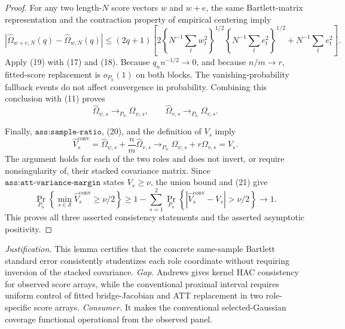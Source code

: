 \documentclass{article}
\begin{document}
\begin{proof}
For any two length-\(N\) score vectors \(w\) and \(w+e\), the same Bartlett-matrix representation and the contraction property of empirical centering imply
\[
 |\widehat\Omega_{w+e,N}(q)-\widehat\Omega_{w,N}(q)|
 \leq(2q+1)\left[
  2\left\{N^{-1}\sum_tw_t^2\right\}^{1/2}
    \left\{N^{-1}\sum_te_t^2\right\}^{1/2}
  +N^{-1}\sum_te_t^2
 \right].                                                                           \tag{19}
\]
Apply (19) with (17) and (18).  Because \(q_n n^{-1/2}\to0\), and because \(n/m\to r\), fitted-score replacement is \(o_{P_n}(1)\) on both blocks.  The vanishing-probability fallback events do not affect convergence in probability.  Combining this conclusion with (11) proves
\[
 \widehat\Omega_{\psi,s}\to_{P_n}\Omega_{\psi,s},
 \qquad
 \widehat\Omega_{v,s}\to_{P_n}\Omega_{v,s}.                                       \tag{20}
\]

Finally, \(\texttt{ass:sample-ratio}\), (20), and the definition of \(V_s\) imply
\[
 \widehat V_s^{\mathrm{conv}}
 =\widehat\Omega_{\psi,s}+\frac nm\widehat\Omega_{v,s}
 \to_{P_n}\Omega_{\psi,s}+r\Omega_{v,s}=V_s.                                     \tag{21}
\]
The argument holds for each of the two roles and does not invert, or require nonsingularity of, their stacked covariance matrix.  Since \(\texttt{ass:att-variance-margin}\) states \(V_s\geq\nu\), the union bound and (21) give
\[
 \Pr_{P_n}\left\{\min_{s\in\mathcal S}\widehat V_s^{\mathrm{conv}}\geq\nu/2\right\}
 \geq 1-\sum_{s=1}^2
 \Pr_{P_n}\left\{|\widehat V_s^{\mathrm{conv}}-V_s|>\nu/2\right\}
 \longrightarrow1.
\]
This proves all three asserted consistency statements and the asserted asymptotic positivity.
\end{proof}
\par\smallskip\noindent \textit{Justification.} This lemma certifies that the concrete same-sample Bartlett standard error consistently studentizes each role coordinate without requiring inversion of the stacked covariance. \textit{Gap.} Andrews gives kernel HAC consistency for observed score arrays, while the conventional proximal interval requires uniform control of fitted bridge-Jacobian and ATT replacement in two role-specific score arrays. \textit{Consumer.} It makes the conventional selected-Gaussian coverage functional operational from the observed panel.
\end{document}

